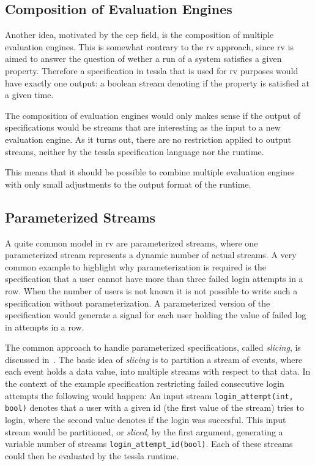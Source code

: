 \subsection{Composition of Evaluation Engines}
\label{sec:conclusion:further_work:composition}

Another idea, motivated by the \gls{cep} field, is the composition of multiple evaluation engines.
This is somewhat contrary to the \gls{rv} approach, since \gls{rv} is aimed to answer the question of wether a run of a system satisfies a given property.
Therefore a specification in \gls{tessla} that is used for \gls{rv} purposes would have exactly one output: a boolean stream denoting if the property is satisfied at a given time.

The composition of evaluation engines would only makes sense if the output of specifications would be streams that are interesting as the input to a new evaluation engine.
As it turns out, there are no restriction applied to output streams, neither by the \gls{tessla} specification language nor the runtime.

This means that it should be possible to combine multiple evaluation engines with only small adjustments to the output format of the runtime.

\subsection{Parameterized Streams}
\label{sec:conclusion:further_work:parametrization}

A quite common model in \gls{rv} are parameterized streams, where one parameterized stream represents a dynamic number of actual streams.
A very common example to highlight why parameterization is required is the specification that a user cannot have more than three failed login attempts in a row.
When the number of users is not known it is not possible to write such a specification without parameterization.
A parameterized version of the specification would generate a signal for each user holding the value of failed log in attempts in a row.

The common approach to handle parameterized specifications, called \emph{slicing}, is discussed in~\cite{Chen2009a}.
The basic idea of \emph{slicing} is to partition a stream of events, where each event holds a data value, into multiple streams with respect to that data.
In the context of the example specification restricting failed consecutive login attempts the following would happen:
An input stream \lstinline{login_attempt(int, bool)} denotes that a user with a given id (the first value of the stream) tries to login, where the second value denotes if the login was succesful.
This input stream would be partitioned, or \emph{sliced}, by the first argument, generating a variable number of streams \lstinline{login_attempt_id(bool)}.
Each of these streams could then be evaluated by the \gls{tessla} runtime.

